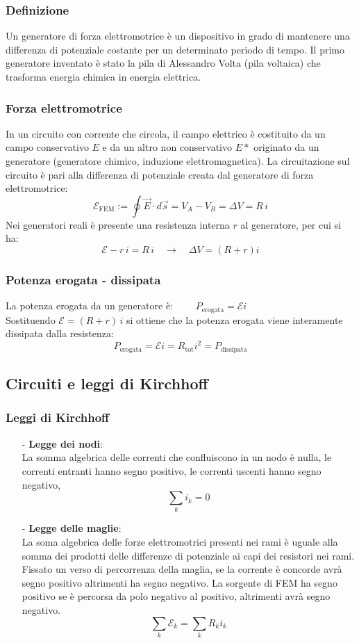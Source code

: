 \documentclass[a4paper]{article}
\begin{document}
\subsubsection*{Definizione}
Un generatore di forza elettromotrice è un dispositivo in grado di mantenere una differenza di potenziale costante per un determinato
periodo di tempo. Il primo generatore inventato è stato la pila di Alessandro Volta (pila voltaica) che trasforma energia chimica in
energia elettrica.

\subsubsection*{Forza elettromotrice}
In un circuito con corrente che circola, il campo elettrico è costituito da un campo conservativo \(E\) e da un altro non conservativo
\(E*\) originato da un generatore (generatore chimico, induzione elettromagnetica). La circuitazione sul circuito è pari alla
differenza di potenziale creata dal generatore di forza elettromotrice:
\[\mathcal{E}_\text{FEM} := \oint \vec{E} \cdot d\vec{s} = V_A - V_B = \Delta V = R \, i\]
Nei generatori reali è presente una resistenza interna \(r\) al generatore, per cui si ha:
\[\mathcal{E} - r \, i = R \, i \quad \rightarrow \quad \Delta V = (R + r) i\]

\subsubsection*{Potenza erogata - dissipata}
La potenza erogata da un generatore è: \(\qquad P_\text{erogata} = \mathcal{E} i\) \\
Sostituendo \(\mathcal{E} = (R + r) \, i\) si ottiene che la potenza erogata viene interamente dissipata dalla resistenza:
\[P_\text{erogata} = \mathcal{E} i = R_\text{tot} i^2 = P_\text{dissipata}\]

\subsection{Circuiti e leggi di Kirchhoff}
\subsubsection*{Leggi di Kirchhoff}
\begin{itemize}
	\item[-] \textbf{Legge dei nodi}: \\
	La somma algebrica delle correnti che confluiscono in un nodo è nulla, le correnti entranti hanno segno	positivo, le correnti
	uscenti hanno segno negativo, \[\sum_k i_k = 0\]
	\item[-] \textbf{Legge delle maglie}: \\
	La soma algebrica delle forze elettromotrici presenti nei rami è uguale alla somma dei prodotti delle differenze di potenziale
	ai capi dei resistori nei rami. Fissato un verso di percorrenza della maglia, se la corrente è concorde avrà segno positivo
	altrimenti ha segno negativo. La sorgente di FEM ha segno positivo se è percorsa da polo negativo al positivo, altrimenti avrà
	segno negativo. \[\sum_k \mathcal{E}_k = \sum_k R_k i_k\]
\end{itemize}
\end{document}
